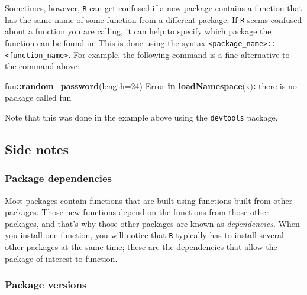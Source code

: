 \documentclass[
]{book}
\newenvironment{Shaded}{\begin{snugshade}}{\end{snugshade}}
\newcommand{\AttributeTok}[1]{\textcolor[rgb]{0.13,0.29,0.53}{#1}}
\newcommand{\ControlFlowTok}[1]{\textcolor[rgb]{0.13,0.29,0.53}{\textbf{#1}}}
\newcommand{\DecValTok}[1]{\textcolor[rgb]{0.00,0.00,0.81}{#1}}
\newcommand{\FunctionTok}[1]{\textcolor[rgb]{0.13,0.29,0.53}{\textbf{#1}}}
\newcommand{\NormalTok}[1]{#1}
\newcommand{\SpecialCharTok}[1]{\textcolor[rgb]{0.81,0.36,0.00}{\textbf{#1}}}
\newcommand{\StringTok}[1]{\textcolor[rgb]{0.31,0.60,0.02}{#1}}
\begin{document}
Sometimes, however, \texttt{R} can get confused if a new package contains a function that has the same name of some function from a different package. If \texttt{R} seems confused about a function you are calling, it can help to specify which package the function can be found in. This is done using the syntax \texttt{\textless{}package\_name\textgreater{}::\textless{}function\_name\textgreater{}}. For example, the following command is a fine alternative to the command above:

\begin{Shaded}
\begin{Highlighting}[]
\NormalTok{fun}\SpecialCharTok{::}\FunctionTok{random\_password}\NormalTok{(}\AttributeTok{length=}\DecValTok{24}\NormalTok{)}
\NormalTok{Error }\ControlFlowTok{in} \FunctionTok{loadNamespace}\NormalTok{(x)}\SpecialCharTok{:}\NormalTok{ there is no package called }\StringTok{\textquotesingle{}fun\textquotesingle{}}
\end{Highlighting}
\end{Shaded}

Note that this was done in the example above using the \texttt{devtools} package.

\subsection*{Side notes}\label{side-notes}

\subsubsection*{Package dependencies}\label{package-dependencies}

Most packages contain functions that are built using functions built from other packages. Those new functions depend on the functions from those other packages, and that's why those other packages are known as \emph{dependencies}. When you install one function, you will notice that \texttt{R} typically has to install several other packages at the same time; these are the dependencies that allow the package of interest to function.

\subsubsection*{Package versions}\label{package-versions}
\end{document}

